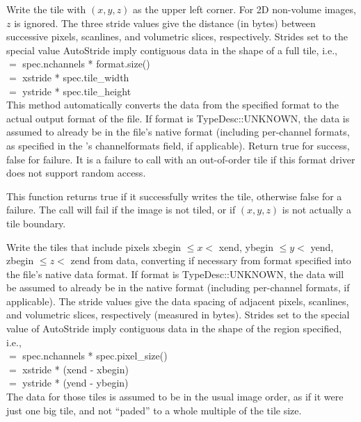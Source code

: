 Write the tile with $(x,y,z)$ as the upper left corner.  For 2D
non-volume images, $z$ is ignored.  The three stride values give the
distance (in bytes) between successive pixels, scanlines, and volumetric
slices, respectively.  Strides set to the special value {\kw AutoStride}
imply contiguous data in the shape of a full tile, i.e., \\
 $=$ {\kw spec.nchannels * format.size()} \\
 $=$ {\kw xstride * spec.tile_width} \\
 $=$ {\kw ystride * spec.tile_height} \\
This method automatically converts the
data from the specified {\kw format} to the actual output format of the
file. 
If {\cf format} is {\cf TypeDesc::UNKNOWN}, the data is assumed to
already be in the file's native format (including per-channel formats, 
as specified in the \ImageSpec's {\cf channelformats} field, if applicable).
Return {\kw true} for success, {\kw false} for failure.  It is a
failure to call \writetile with an out-of-order tile if this
format driver does not support random access.

This function returns {\cf true} if it successfully writes the tile,
otherwise {\cf false} for a failure.
The call will fail if the image is not tiled, or if $(x,y,z)$ is not
actually a tile boundary.
\apiend


Write the tiles that include pixels {\kw xbegin} $\le x <$ {\kw xend},
{\kw ybegin} $\le y <$ {\kw yend}, {\kw zbegin} $\le z <$ {\kw zend}
from {\kw data},
converting if necessary from {\kw format} specified into the file's
native data format.
If {\cf format} is {\cf TypeDesc::UNKNOWN}, the data will be assumed
to already be in the native format (including per-channel formats, if applicable).
The stride values
give the data spacing of adjacent pixels, scanlines, and volumetric
slices, respectively (measured in bytes).  Strides set to the special
value of {\kw AutoStride} imply contiguous data in the shape of the
region specified, i.e., \\
 $=$ {\kw spec.nchannels * spec.pixel_size()} \\
 $=$ {\kw xstride * (xend - xbegin)} \\
 $=$ {\kw ystride * (yend - ybegin)} \\
The data for those tiles is assumed to be in the usual image order, as if
it were just one big tile, and not ``paded'' to a whole multiple of the tile size.

